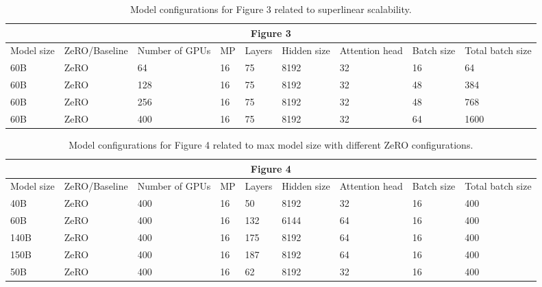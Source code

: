 \documentclass{article}
\begin{document}
\begin{table}[t!]
\scriptsize
\begin{tabular}{|l|l|l|l|l|l|l|l|l|}
\hline
\multicolumn{9}{|c|}{Figure 3} \\ \hline
Model size & ZeRO/Baseline & Number of GPUs & MP & Layers & Hidden size & Attention head & Batch size & Total batch size \\ \hline
60B & ZeRO & 64 & 16 & 75 & 8192 & 32 & 16 & 64 \\ \hline
60B & ZeRO & 128 & 16 & 75 & 8192 & 32 & 48 & 384 \\ \hline
60B & ZeRO & 256 & 16 & 75 & 8192 & 32 & 48 & 768 \\ \hline
60B & ZeRO & 400 & 16 & 75 & 8192 & 32 & 64 & 1600 \\ \hline
\end{tabular}
\caption{Model configurations for Figure 3 related to superlinear scalability.} \label{tab:fig3-tab}
\end{table}

\begin{table}[t!]
\scriptsize
\begin{tabular}{|l|l|l|l|l|l|l|l|l|}
\hline
\multicolumn{9}{|c|}{Figure 4} \\ \hline
Model size & ZeRO/Baseline & Number of GPUs & MP & Layers & Hidden size & Attention head & Batch size & Total batch size \\ \hline
40B & ZeRO & 400 & 16 & 50 & 8192 & 32 & 16 & 400 \\ \hline
60B & ZeRO & 400 & 16 & 132 & 6144 & 64 & 16 & 400 \\ \hline
140B & ZeRO & 400 & 16 & 175 & 8192 & 64 & 16 & 400 \\ \hline
150B & ZeRO & 400 & 16 & 187 & 8192 & 64 & 16 & 400 \\ \hline
50B & ZeRO & 400 & 16 & 62 & 8192 & 32 & 16 & 400 \\ \hline
\end{tabular}
\caption{Model configurations for Figure 4 related to max model size with different ZeRO configurations.} \label{tab:fig4-tab}
\end{table}
\end{document}
